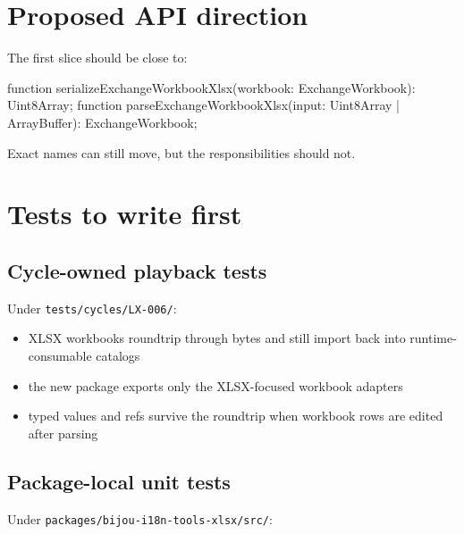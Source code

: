 \section{Proposed API direction}\label{record-193-proposed-api-direction}

The first slice should be close to:

\begin{CodeBlock}
function serializeExchangeWorkbookXlsx(workbook: ExchangeWorkbook): Uint8Array;
function parseExchangeWorkbookXlsx(input: Uint8Array | ArrayBuffer): ExchangeWorkbook;
\end{CodeBlock}

Exact names can still move, but the responsibilities should not.

\section{Tests to write first}\label{record-193-tests-to-write-first}

\subsection{Cycle-owned playback tests}\label{record-193-cycle-owned-playback-tests}

Under \texttt{t\allowbreak{}e\allowbreak{}s\allowbreak{}t\allowbreak{}s\allowbreak{}/\allowbreak{}c\allowbreak{}y\allowbreak{}c\allowbreak{}l\allowbreak{}e\allowbreak{}s\allowbreak{}/\allowbreak{}L\allowbreak{}X\allowbreak{}-\allowbreak{}0\allowbreak{}0\allowbreak{}6\allowbreak{}/}:

\begin{itemize}
\tightlist
\item
  XLSX workbooks roundtrip through bytes and still import back into runtime-consumable catalogs
\item
  the new package exports only the XLSX-focused workbook adapters
\item
  typed values and refs survive the roundtrip when workbook rows are edited after parsing
\end{itemize}

\subsection{Package-local unit tests}\label{record-193-package-local-unit-tests}

Under \texttt{p\allowbreak{}a\allowbreak{}c\allowbreak{}k\allowbreak{}a\allowbreak{}g\allowbreak{}e\allowbreak{}s\allowbreak{}/\allowbreak{}b\allowbreak{}i\allowbreak{}j\allowbreak{}o\allowbreak{}u\allowbreak{}-\allowbreak{}i\allowbreak{}1\allowbreak{}8\allowbreak{}n\allowbreak{}-\allowbreak{}t\allowbreak{}o\allowbreak{}o\allowbreak{}l\allowbreak{}s\allowbreak{}-\allowbreak{}x\allowbreak{}l\allowbreak{}s\allowbreak{}x\allowbreak{}/\allowbreak{}s\allowbreak{}r\allowbreak{}c\allowbreak{}/}:

